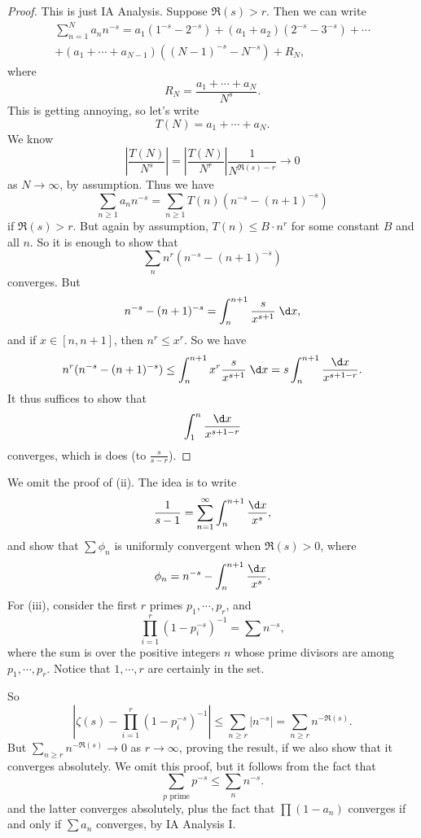 \documentclass[a4paper]{article}
\begin{document}
\begin{proof}
  This is just IA Analysis. Suppose $\Re(s) > r$. Then we can write
  \begin{multline*}
    \sum_{n = 1}^N a_n n^{-s} = a_1 (1^{-s} - 2^{-s}) + (a_1 + a_2)(2^{-s} - 3^{-s}) + \cdots\\ + (a_1 + \cdots + a_{N - 1})((N - 1)^{-s} - N^{-s}) + R_N,
  \end{multline*}
  where
  \[
    R_N = \frac{a_1 + \cdots + a_N}{N^s}.
  \]
  This is getting annoying, so let's write
  \[
    T(N) = a_1 + \cdots + a_N.
  \]
  We know
  \[
    \left|\frac{T(N)}{N^s}\right| = \left|\frac{T(N)}{N^r}\right| \frac{1}{N^{\Re(s) - r}} \to 0
  \]
  as $N \to \infty$, by assumption. Thus we have
  \[
    \sum_{n \geq 1} a_n n^{-s} = \sum_{n \geq 1} T(n) (n^{-s} - (n + 1)^{-s})
  \]
  if $\Re(s) > r$. But again by assumption, $T(n) \leq B \cdot n^r$ for some constant $B$ and all $n$. So it is enough to show that
  \[
    \sum_n n^r (n^{-s} - (n + 1)^{-s})
  \]
  converges. But
  \[
    n^{-s} - (n + 1)^{-s} = \int_n^{n + 1} \frac{s}{x^{s + 1}}\;\d x,
  \]
  and if $x \in [n, n + 1]$, then $n^r \leq x^r$. So we have
  \[
    n^r (n^{-s} - (n + 1)^{-s}) \leq \int_n^{n + 1} x^r \frac{s}{x^{s + 1}} \;\d x = s \int_n^{n + 1} \frac{\d x}{x^{s + 1 - r}}.
  \]
  It thus suffices to show that
  \[
    \int_1^n \frac{\d x}{x^{s + 1 - r}}
  \]
  converges, which is does (to $\frac{s}{s - r}$).
\end{proof}

We omit the proof of (ii). The idea is to write
\[
  \frac{1}{s - 1} = \sum_{n = 1}^\infty \int_n^{n + 1} \frac{\d x}{x^s},
\]
and show that $\sum \phi_n$ is uniformly convergent when $\Re(s) > 0$, where
\[
  \phi_n = n^{-s} - \int_n^{n + 1} \frac{\d x}{x^s}.
\]
For (iii), consider the first $r$ primes $p_1, \cdots, p_r$, and
\[
  \prod_{i = 1}^r (1 - p_i^{-s})^{-1} = \sum n^{-s},
\]
where the sum is over the positive integers $n$ whose prime divisors are among $p_1, \cdots, p_r$. Notice that $1, \cdots, r$ are certainly in the set.

So
\[
  \left|\zeta(s) - \prod_{i = 1}^r (1 - p_i^{-s})^{-1}\right| \leq \sum_{n \geq r} |n^{-s}| = \sum_{n \geq r} n^{-\Re(s)}.
\]
But $\sum_{n \geq r} n^{-\Re(s)} \to 0$ as $r \to \infty$, proving the result, if we also show that it converges absolutely. We omit this proof, but it follows from the fact that
\[
  \sum_{p \text{ prime}} p^{-s} \leq \sum_n n^{-s}.
\]
and the latter converges absolutely, plus the fact that $\prod (1 - a_n)$ converges if and only if $\sum a_n$ converges, by IA Analysis I.
\end{document}
